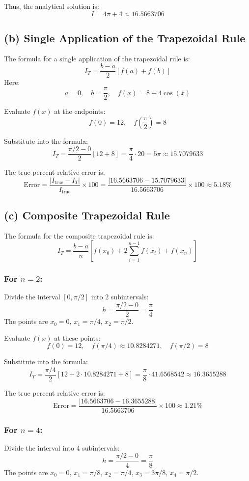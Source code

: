 \documentclass[11pt]{article}
\begin{document}
Thus, the analytical solution is:
\[
I = 4\pi + 4 \approx 16.5663706
\]



\subsection*{(b) Single Application of the Trapezoidal Rule}
The formula for a single application of the trapezoidal rule is:
\[
I_T = \frac{b - a}{2}\left[f(a) + f(b)\right]
\]
Here:
\[
a = 0, \quad b = \frac{\pi}{2}, \quad f(x) = 8 + 4\cos(x)
\]

Evaluate \(f(x)\) at the endpoints:
\[
f(0) = 12, \quad f\left(\frac{\pi}{2}\right) = 8
\]

Substitute into the formula:
\[
I_T = \frac{\pi/2 - 0}{2}\left[12 + 8\right] = \frac{\pi}{4} \cdot 20 = 5\pi \approx 15.7079633
\]

The true percent relative error is:
\[
\text{Error} = \frac{|I_{\text{true}} - I_T|}{I_{\text{true}}} \times 100 = \frac{|16.5663706 - 15.7079633|}{16.5663706} \times 100 \approx 5.18\%
\]



\subsection*{(c) Composite Trapezoidal Rule}

The formula for the composite trapezoidal rule is:
\[
I_T = \frac{b - a}{n}\left[f(x_0) + 2\sum_{i=1}^{n-1} f(x_i) + f(x_n)\right]
\]

\subsubsection*{For \(n = 2\):}
Divide the interval \([0, \pi/2]\) into 2 subintervals:
\[
h = \frac{\pi/2 - 0}{2} = \frac{\pi}{4}
\]
The points are \(x_0 = 0\), \(x_1 = \pi/4\), \(x_2 = \pi/2\).

Evaluate \(f(x)\) at these points:
\[
f(0) = 12, \quad f(\pi/4) \approx 10.8284271, \quad f(\pi/2) = 8
\]

Substitute into the formula:
\[
I_T = \frac{\pi/4}{2}\left[12 + 2 \cdot 10.8284271 + 8\right] = \frac{\pi}{8}\cdot 41.6568542 \approx 16.3655288
\]

The true percent relative error is:
\[
\text{Error} = \frac{|16.5663706 - 16.3655288|}{16.5663706} \times 100 \approx 1.21\%
\]

\subsubsection*{For \(n = 4\):}
Divide the interval into 4 subintervals:
\[
h = \frac{\pi/2 - 0}{4} = \frac{\pi}{8}
\]
The points are \(x_0 = 0\), \(x_1 = \pi/8\), \(x_2 = \pi/4\), \(x_3 = 3\pi/8\), \(x_4 = \pi/2\).
\end{document}
